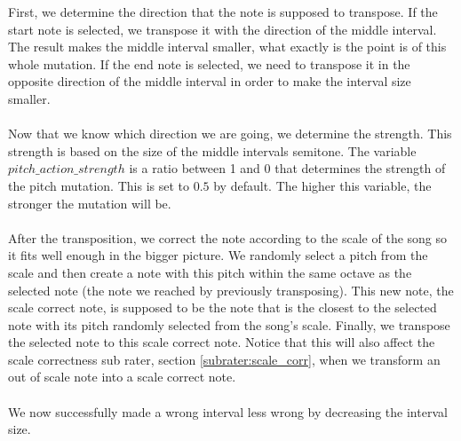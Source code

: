 \documentclass[a4paper]{article}
\begin{document}
First, we determine the direction that the note is supposed to transpose. If the start note is selected, we transpose it with the direction of the middle interval. The result makes the middle interval smaller, what exactly is the point is of this whole mutation. If the end note is selected, we need to transpose it in the opposite direction of the middle interval in order to make the interval size smaller.
\\\\
Now that we know which direction we are going, we determine the strength. This strength is based on the size of the middle intervals semitone. The variable $pitch\_action\_strength$ is a ratio between 1 and 0 that determines the strength of the pitch mutation. This is set to $0.5$ by default. The higher this variable, the stronger the mutation will be.
\\\\
After the transposition, we correct the note according to the scale of the song so it fits well enough in the bigger picture. We randomly select a pitch from the scale and then create a note with this pitch within the same octave as the selected note (the note we reached by previously transposing). This new note, the scale correct note, is supposed to be the note that is the closest to the selected note with its pitch randomly selected from the song's scale. Finally, we transpose the selected note to this scale correct note. Notice that this will also affect the scale correctness sub rater, section \ref{subrater:scale_corr}, when we transform an out of scale note into a scale correct note. 
\\\\
We now successfully made a wrong interval less wrong by decreasing the interval size.
\end{document}
